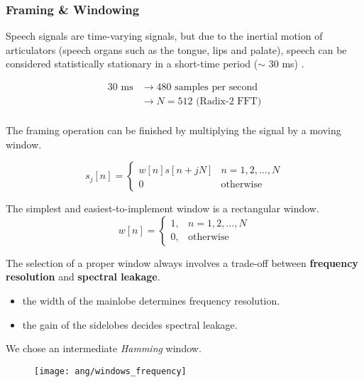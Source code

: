 
\begin{frame}
\frametitle{Framing \& Windowing}
Speech signals are time-varying signals, but due to the inertial motion of articulators (speech organs such as the tongue, lips and palate), speech can be considered statistically stationary in a short-time period ($\sim$ 30 ms) \cite{brandstein1995practical}.

\begin{align*}
30 \text{ ms} &\longrightarrow 480 \text{ samples per second}\\
&\longrightarrow N = 512 \text{ (Radix-2 FFT)}\\
\end{align*}
\end{frame}


\begin{frame}
The framing operation can be finished by multiplying the signal by a moving window.

\begin{equation}
\label{eq:windowing}
s_j[n] =
\begin{cases}
w[n] s[n+jN] & n = 1, 2, \dots, N\\
0 & \text{otherwise}
\end{cases}
\end{equation}

The simplest and easiest-to-implement window is a rectangular window.
\begin{equation}
\label{eq:rectagular-window}
w[n] =
\begin{cases}
1, & n = 1, 2, \dots, N\\
0, & \text{otherwise}
\end{cases}
\end{equation}
\end{frame}


\begin{frame}
The selection of a proper window always involves a trade-off between \textbf{frequency resolution} and \textbf{spectral leakage}.

\begin{itemize}
\item the width of the mainlobe determines frequency resolution.
\item the gain of the sidelobes decides spectral leakage.
\end{itemize}
We chose an intermediate \textit{Hamming} window.

\begin{figure}[H]
\centering
\texttt{[image: ang/windows\_frequency]}
\end{figure}
\end{frame}
